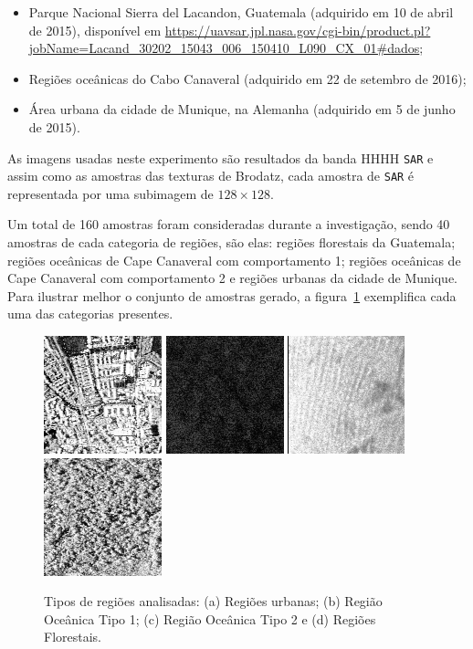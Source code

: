 \documentclass[remotesensing,article,submit,moreauthors,pdftex,10pt,a4paper]{Definitions/mdpi}
\begin{document}
	\begin{itemize}
		\item Parque Nacional Sierra del Lacandon, Guatemala (adquirido em 10 de abril de 2015), disponível em \url{https://uavsar.jpl.nasa.gov/cgi-bin/product.pl?jobName=Lacand_30202_15043_006_150410_L090_CX_01#dados};
		\item Regiões oceânicas do Cabo Canaveral (adquirido em 22 de setembro de 2016);
		\item Área urbana da cidade de Munique, na Alemanha (adquirido em 5 de junho de 2015).
	\end{itemize}
	
	As imagens usadas neste experimento são resultados da banda HHHH \texttt{SAR} e assim como as amostras das texturas de Brodatz, cada amostra de \texttt{SAR} é representada por uma subimagem de $128 \times 128$.
	
	Um total de 160 amostras foram consideradas durante a investigação, sendo 40 amostras de cada categoria de regiões, são elas: regiões florestais da Guatemala; regiões oceânicas de Cape Canaveral com comportamento 1; regiões oceânicas de Cape Canaveral com comportamento 2 e regiões urbanas da cidade de Munique. Para ilustrar melhor o conjunto de amostras gerado, a figura~\ref{fig:RegioesSAR} exemplifica cada uma das categorias presentes.
	
	\begin{figure}[!h]
		\centering
		\includegraphics[width=.23\linewidth]{Figures/munichUrban.png}
		\includegraphics[width=.23\linewidth]{Figures/Cape1.png}
		\includegraphics[width=.23\linewidth]{Figures/Cape2.png}
		\includegraphics[width=.23\linewidth]{Figures/guatemalaflorest.png}
		\caption{Tipos de regiões analisadas: (a) Regiões urbanas; (b) Região Oceânica Tipo 1; (c) Região Oceânica Tipo 2 e (d) Regiões Florestais.}\label{fig:RegioesSAR}
	\end{figure}
	
\end{document}
